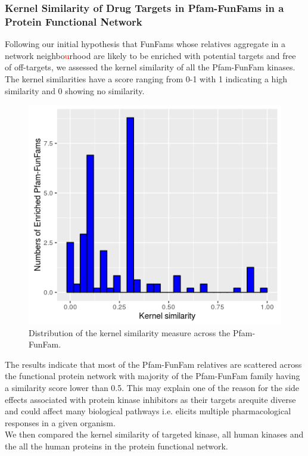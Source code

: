 \documentclass[a4paper, 11pt]{article}
\newcommand{\redinsert}[1]{\textcolor{red}{#1}} %
\begin{document}
\subsubsection*{Kernel Similarity of Drug Targets in Pfam-FunFams in a Protein Functional Network}
Following our initial hypothesis that FunFams whose relatives aggregate in a network neighbo\redinsert{u}rhood are likely to be enriched with potential targets and free of off-targets, we assessed the kernel similarity of all the Pfam-FunFam kinases.  The kernel similarities have a score ranging from 0-1 with 1 indicating a high similarity and 0 showing no similarity. 
\begin{figure}[H]
	\includegraphics[width=.8\linewidth]{figures/ksim_plot.png}
	\centering
	\caption{Distribution of the kernel similarity measure across the Pfam-FunFam.}
	\label{ksim_plot}
\end{figure}
The results indicate that most of the Pfam-FunFam relatives are scattered across the functional protein network with majority of the Pfam-FunFam family having a similarity score lower than 0.5. This may explain one of the reason for the side effects associated with protein kinase inhibitors as their targets arequite diverse and could affect many biological pathways i.e. elicits multiple pharmacological responses in a given organism.\\
We then compared the kernel similarity of targeted kinase, all human kinases and the all the human proteins in the protein functional network. 
\end{document}

